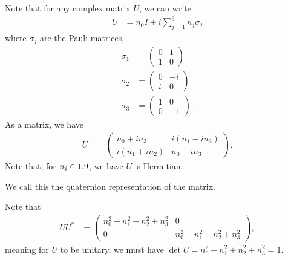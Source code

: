 \documentclass[10pt]{mypackage}
\begin{document}
\begin{example}
  Note that for any complex matrix $U$, we can write
  \begin{align*}
    U &= n_0 I + i \sum_{j=1}^{3}n_j\sigma_j
  \end{align*}
  where $\sigma_j$ are the Pauli matrices,
  \begin{align*}
    \sigma_1 &= \begin{pmatrix}0 & 1 \\ 1 & 0\end{pmatrix}\\
    \sigma_2 &= \begin{pmatrix}0 & -i \\ i & 0\end{pmatrix}\\
    \sigma_3 &= \begin{pmatrix}1 & 0 \\ 0 & -1\end{pmatrix}.
  \end{align*}
  As a matrix, we have
  \begin{align*}
    U &= \begin{pmatrix}n_0 + in_3 & i\left(n_1 - in_2\right) \\ i\left(n_1 + in_2\right) & n_0 - in_3\end{pmatrix}.
  \end{align*}
  Note that, for $n_i\in 1.9$, we have $U$ is Hermitian.\newline

  We call this the quaternion representation of the matrix.\newline

  Note that
  \begin{align*}
    UU^{\ast} &= \begin{pmatrix}n_0^2 + n_1^2 + n_2^2 + n_3^2 & 0 \\ 0 & n_0^2 + n_1^2 + n_2^2 + n_3^2\end{pmatrix},
  \end{align*}
  meaning for $U$ to be unitary, we must have $\det U = n_0^2 + n_1^2 + n_2^2 + n_3^2 = 1$.\newline


\end{example}
\end{document}
